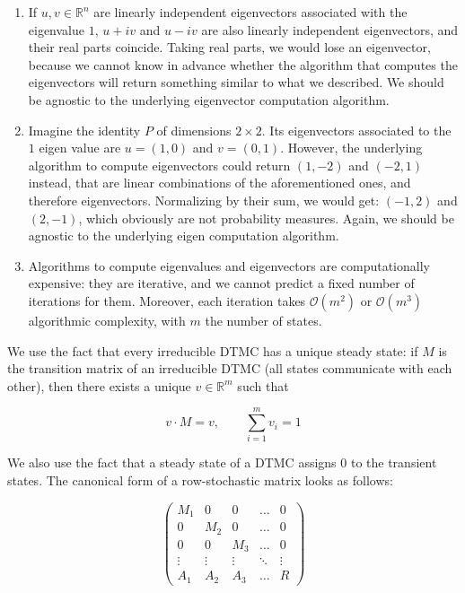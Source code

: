 \documentclass[
  nojss]{jss}
\begin{document}
\begin{enumerate}
\def\labelenumi{\arabic{enumi}.}
\item
  If \(u, v \in \mathbb{R}^n\) are linearly independent eigenvectors associated with the eigenvalue \(1\), \(u + iv\) and \(u - iv\) are also linearly independent eigenvectors, and their real parts coincide. Taking real parts, we would lose an eigenvector, because we cannot know in advance whether the algorithm that computes the eigenvectors will return something similar to what we described. We should be agnostic to the underlying eigenvector computation algorithm.
\item
  Imagine the identity \(P\) of dimensions \(2 \times 2\). Its eigenvectors associated to the \(1\) eigen value are \(u = (1, 0)\) and \(v = (0, 1)\). However, the underlying algorithm to compute eigenvectors could return \((1, -2)\) and \((-2, 1)\) instead, that are linear combinations of the aforementioned ones, and therefore eigenvectors. Normalizing by their sum, we would get: \((-1, 2)\) and \((2, -1)\), which obviously are not probability measures. Again, we should be agnostic to the underlying eigen computation algorithm.
\item
  Algorithms to compute eigenvalues and eigenvectors are computationally expensive: they are iterative, and we cannot predict a fixed number of iterations for them. Moreover, each iteration takes \(\mathcal{O}(m^2)\) or \(\mathcal{O}(m^3)\) algorithmic complexity, with \(m\) the number of states.
\end{enumerate}

We use the fact that every irreducible DTMC has a unique steady state: if \(M\) is the transition matrix of an irreducible DTMC (all states communicate with each other), then there exists a unique \(v \in \mathbb{R}^m\) such that

\[ v \cdot M = v, \qquad \sum_{i = 1}^m v_i = 1 \]

We also use the fact that a steady state of a DTMC assigns \(0\) to the transient states. The canonical form of a row-stochastic matrix looks as follows:

\[
\left(\begin{array}{c|c|c|c|c}
M_1 & 0 & 0 & \ldots & 0 \\
\hline
0 & M_2 & 0 & \ldots & 0 \\
\hline
0 & 0 & M_3 & \ldots & 0 \\
\hline
\vdots & \vdots & \vdots & \ddots & \vdots \\
\hline
A_1 & A_2 & A_3 & \ldots & R
\end{array}\right)
\]
\end{document}
